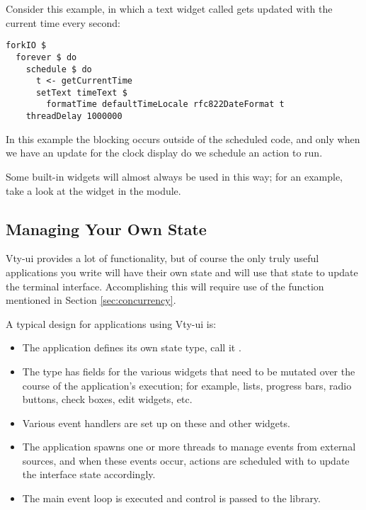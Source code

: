 Consider this example, in which a text widget called 
gets updated with the current time every second:

\begin{verbatim}
forkIO $
  forever $ do
    schedule $ do
      t <- getCurrentTime
      setText timeText $
        formatTime defaultTimeLocale rfc822DateFormat t
    threadDelay 1000000
\end{verbatim}

In this example the blocking occurs outside of the scheduled code, and
only when we have an update for the clock display do we schedule an
action to run.

Some built-in widgets will almost always be used in this way; for an
example, take a look at the  widget in the
 module.

\subsection{Managing Your Own State}

Vty-ui provides a lot of functionality, but of course the only truly
useful applications you write will have their own state and will use
that state to update the terminal interface.  Accomplishing this will
require use of the  function mentioned in Section
\ref{sec:concurrency}.

A typical design for applications using Vty-ui is:

\begin{itemize}
\item The application defines its own state type, call it
  .
\item The  type has fields for the various widgets that
  need to be mutated over the course of the application's execution;
  for example, lists, progress bars, radio buttons, check boxes, edit
  widgets, etc.
\item Various event handlers are set up on these and other widgets.
\item The application spawns one or more threads to manage events from
  external sources, and when these events occur, actions are scheduled
  with  to update the interface state accordingly.
\item The main event loop is executed and control is passed to the
  library.
\end{itemize}
